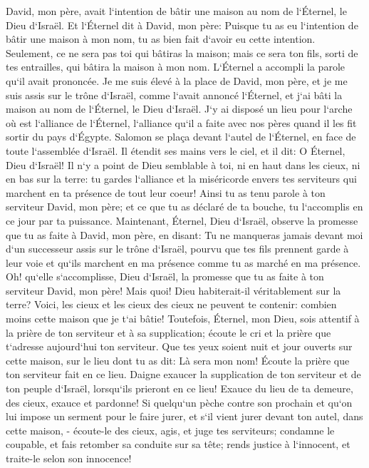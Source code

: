 \verse David, mon père, avait l`intention de bâtir une maison au nom de l`Éternel, le Dieu d`Israël. 
\verse Et l`Éternel dit à David, mon père: Puisque tu as eu l`intention de bâtir une maison à mon nom, tu as bien fait d`avoir eu cette intention. 
\verse Seulement, ce ne sera pas toi qui bâtiras la maison; mais ce sera ton fils, sorti de tes entrailles, qui bâtira la maison à mon nom. 
\verse L`Éternel a accompli la parole qu`il avait prononcée. Je me suis élevé à la place de David, mon père, et je me suis assis sur le trône d`Israël, comme l`avait annoncé l`Éternel, et j`ai bâti la maison au nom de l`Éternel, le Dieu d`Israël. 
\verse J`y ai disposé un lieu pour l`arche où est l`alliance de l`Éternel, l`alliance qu`il a faite avec nos pères quand il les fit sortir du pays d`Égypte. 
\verse Salomon se plaça devant l`autel de l`Éternel, en face de toute l`assemblée d`Israël. Il étendit ses mains vers le ciel, et il dit: 
\verse O Éternel, Dieu d`Israël! Il n`y a point de Dieu semblable à toi, ni en haut dans les cieux, ni en bas sur la terre: tu gardes l`alliance et la miséricorde envers tes serviteurs qui marchent en ta présence de tout leur coeur! 
\verse Ainsi tu as tenu parole à ton serviteur David, mon père; et ce que tu as déclaré de ta bouche, tu l`accomplis en ce jour par ta puissance. 
\verse Maintenant, Éternel, Dieu d`Israël, observe la promesse que tu as faite à David, mon père, en disant: Tu ne manqueras jamais devant moi d`un successeur assis sur le trône d`Israël, pourvu que tes fils prennent garde à leur voie et qu`ils marchent en ma présence comme tu as marché en ma présence. 
\verse Oh! qu`elle s`accomplisse, Dieu d`Israël, la promesse que tu as faite à ton serviteur David, mon père! 
\verse Mais quoi! Dieu habiterait-il véritablement sur la terre? Voici, les cieux et les cieux des cieux ne peuvent te contenir: combien moins cette maison que je t`ai bâtie! 
\verse Toutefois, Éternel, mon Dieu, sois attentif à la prière de ton serviteur et à sa supplication; écoute le cri et la prière que t`adresse aujourd`hui ton serviteur. 
\verse Que tes yeux soient nuit et jour ouverts sur cette maison, sur le lieu dont tu as dit: Là sera mon nom! Écoute la prière que ton serviteur fait en ce lieu. 
\verse Daigne exaucer la supplication de ton serviteur et de ton peuple d`Israël, lorsqu`ils prieront en ce lieu! Exauce du lieu de ta demeure, des cieux, exauce et pardonne! 
\verse Si quelqu`un pèche contre son prochain et qu`on lui impose un serment pour le faire jurer, et s`il vient jurer devant ton autel, dans cette maison, - 
\verse écoute-le des cieux, agis, et juge tes serviteurs; condamne le coupable, et fais retomber sa conduite sur sa tête; rends justice à l`innocent, et traite-le selon son innocence! 
